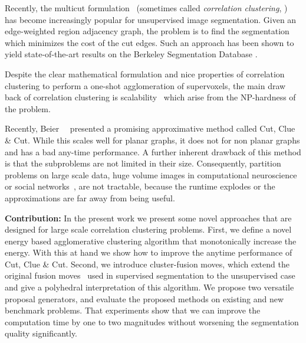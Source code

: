 \documentclass[10pt,twocolumn,letterpaper]{article}
\begin{document}
Recently, the multicut formulation~\cite{chopra_1993_mp, Kappes-2013-multicut}
(sometimes called \emph{correlation clustering}, \cite{bansal_2004_ml})
has become increasingly popular for unsupervised image segmentation.
%
Given an edge-weighted region adjacency graph,
the problem is to find the segmentation which
minimizes the cost of the cut edges.
Such an approach has been shown to yield
state-of-the-art results on the Berkeley Segmentation Database
\cite{andres_2011_iccv,yarkony_2012_eccv,alush_2013_simbad}.

Despite the clear mathematical formulation and nice properties of correlation clustering
to perform a one-shot agglomeration of supervoxels,
the main draw back of correlation clustering is scalability~\cite{nunez_iglesias_2013}
which arise from the NP-hardness of the problem.

Recently, Beier~\etal~\cite{Beier-2014} presented a promising 
approximative method called Cut, Clue \& Cut.
While this scales well for planar graphs, it does not for non planar graphs and has a bad any-time performance.
A further inherent drawback of this method is that the subproblems are not limited in their size.
%
Consequently, partition problems on large scale data, \eg
huge volume images in computational neuroscience~\cite{kroeger_2012_eccv}
or social networks~\cite{Leskovec-2010}, 
are not tractable, because the runtime explodes or the 
approximations are far away from being useful.


\textbf{Contribution:}
In the present work we present some novel approaches that are designed for large scale correlation clustering problems.
First, we define a novel energy based agglomerative clustering algorithm that monotonically increase the energy.
With this at hand we show how to improve the anytime performance of Cut, Clue \& Cut.
Second, we introduce cluster-fusion moves, which extend the original fusion moves~\cite{Lempinski-2010} 
used in supervised segmentation to the unsupervised case and give a polyhedral interpretation of this algorithm.
We propose two versatile proposal generators, and evaluate the proposed methods on existing and new benchmark problems.
That experiments show that we can improve the computation time by one to two magnitudes without worsening the segmentation 
quality significantly.
\end{document}
